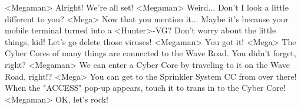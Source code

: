 <Megaman> Alright! We're all set! 
<Megaman> Weird... 
Don't I look a little different to you? 
<Mega> Now that you mention it... 
Maybe it's because your mobile terminal turned into a <Hunter>-VG? 
Don't worry about the little things, kid! 
Let's go delete those viruses! 
<Megaman> You got it! 
<Mega> The Cyber Cores of many things are connected to the Wave Road. 
You didn't forget, right? 
<Megaman> We can enter a Cyber Core by traveling to it on the Wave Road, right!? 
<Mega> You can get to the Sprinkler System CC from over there! 
When the "ACCESS" pop-up appears, touch it to trans in to the Cyber Core! 
<Megaman> OK, let's rock! 
